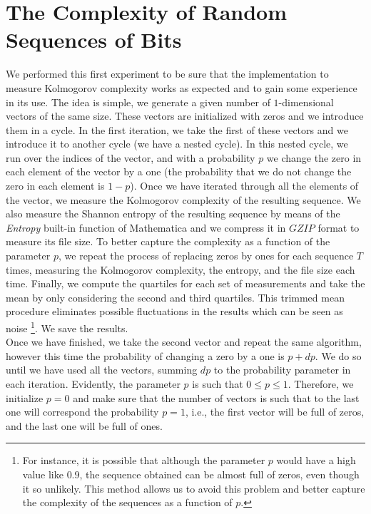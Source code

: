 \section{The Complexity of Random Sequences of Bits}
\label{complex_seqs_section}
We performed this first experiment to be sure that the implementation to measure Kolmogorov complexity works as expected and to gain some experience in its use. The idea is simple, we generate a given number of $1$-dimensional vectors of the same size. These vectors are initialized with zeros and we introduce them in a cycle. In the first iteration, we take the first of these vectors and we introduce it to another cycle (we have a nested cycle). In this nested cycle, we run over the indices of the vector, and with a probability $p$ we change the zero in each element of the vector by a one (the probability that we do not change the zero in each element is $1-p$). Once we have iterated through all the elements of the vector, we measure the Kolmogorov complexity of the resulting sequence. We also measure the Shannon entropy of the resulting sequence by means of the \textit{Entropy} built-in function of Mathematica and we compress it in $GZIP$ format to measure its file size. To better capture the complexity as a function of the parameter $p$, we repeat the process of replacing zeros by ones for each sequence $T$ times, measuring the Kolmogorov complexity, the entropy, and the file size each time. Finally, we compute the quartiles for each set of measurements and take the mean by only considering the second and third quartiles. This trimmed mean procedure eliminates possible fluctuations in the results which can be seen as noise \footnote{For instance, it is possible that although the parameter $p$ would have a high value like $0.9$, the sequence obtained can be almost full of zeros, even though it so unlikely. This method allows us to avoid this problem and better capture the complexity of the sequences as a function of $p$.}. We save the results.\\

Once we have finished, we take the second vector and repeat the same algorithm, however this time the probability of changing a zero by a one is $p+dp$. We do so until we have used all the vectors, summing $dp$ to the probability parameter in each iteration. Evidently, the parameter $p$ is such that $0\leq p \leq 1$. Therefore, we initialize $p=0$ and make sure that the number of vectors is such that to the last one will correspond the probability $p=1$, i.e., the first vector will be full of zeros, and the last one will be full of ones.\\

